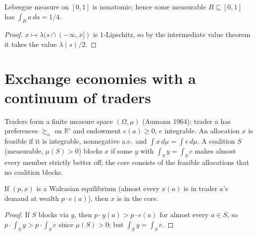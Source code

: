 \begin{theorem}[Witnesses]
\label{thm:lyapunov_integral_witness}
\leanok
{}
Lebesgue measure on $[0,1]$ is nonatomic; hence some measurable $B \subseteq [0,1]$ has $\int_B a\,da = 1/4$.
\end{theorem}
\begin{proof}
\leanok
$x \mapsto \lambda(s \cap (-\infty, x])$ is $1$-Lipschitz, so by the intermediate value theorem it takes the value
$\lambda(s)/2$.
\end{proof}

\section{Exchange economies with a continuum of traders}
\label{sec:continuum_economy}

Traders form a finite measure space $(\Omega, \mu)$ (Aumann 1964); trader $a$ has preferences $\succsim_a$ on
$\mathbb{R}^\iota$ and endowment $e(a) \ge 0$, $e$ integrable. An allocation $x$ is feasible if it is integrable,
nonnegative a.e.\ and $\int x\,d\mu = \int e\,d\mu$. A coalition $S$ (measurable, $\mu(S) > 0$) blocks $x$ if some $y$ with
$\int_S y = \int_S e$ makes almost every member strictly better off; the core consists of the feasible allocations that no
coalition blocks.

\begin{theorem}
\label{thm:continuum_we_core}
\leanok
If $(p, x)$ is a Walrasian equilibrium (almost every $x(a)$ is in trader $a$'s demand at wealth $p \cdot e(a)$), then $x$
is in the core.
\end{theorem}
\begin{proof}
\leanok
If $S$ blocks via $y$, then $p \cdot y(a) > p \cdot e(a)$ for almost every $a \in S$, so
$p \cdot \int_S y > p \cdot \int_S e$ since $\mu(S) > 0$; but $\int_S y = \int_S e$.
\end{proof}

